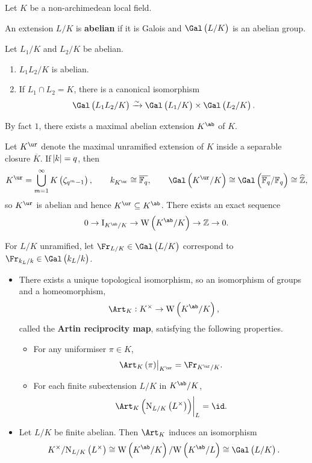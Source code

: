 
Let $ K $ be a non-archimedean local field.

\begin{definition}
An extension $ L / K $ is \textbf{abelian} if it is Galois and $ \Gal\br{L / K} $ is an abelian group.
\end{definition}

\begin{fact*}
Let $ L_1 / K $ and $ L_2 / K $ be abelian.
\begin{enumerate}
\item $ L_1L_2 / K $ is abelian.
\item If $ L_1 \cap L_2 = K $, there is a canonical isomorphism
$$ \Gal\br{L_1L_2 / K} \xrightarrow{\sim} \Gal\br{L_1 / K} \times \Gal\br{L_2 / K}. $$
\end{enumerate}
By fact $ 1 $, there exists a maximal abelian extension $ K^{\ab} $ of $ K $.
\end{fact*}

\begin{example*}
Let $ K^{\ur} $ denote the maximal unramified extension of $ K $ inside a separable closure $ \overline{K} $. If $ \abs{k} = q $, then
$$ K^{\ur} = \bigcup_{m = 1}^\infty K\br{\zeta_{q^m - 1}}, \qquad k_{K^{\ur}} \cong \overline{\FF_q}, \qquad \Gal\br{K^{\ur} / K} \cong \Gal\br{\overline{\FF_q} / \FF_q} \cong \widehat{\ZZ}, $$
so $ K^{\ur} $ is abelian and hence $ K^{\ur} \subseteq K^{\ab} $. There exists an exact sequence
$$ 0 \to \I_{K^{\ab} / K} \to \W\br{K^{\ab} / K} \to \ZZ \to 0. $$
\end{example*}

For $ L / K $ unramified, let $ \Fr_{L / K} \in \Gal\br{L / K} $ correspond to $ \Fr_{k_L / k} \in \Gal\br{k_L / k} $.

\begin{theorem}
\hfill
\begin{itemize}
\item There exists a unique topological isomorphism, so an isomorphism of groups and a homeomorphism,
$$ \Art_K : K^\times \to \W\br{K^{\ab} / K}, $$
called the \textbf{Artin reciprocity map}, satisfying the following properties.
\begin{itemize}
\item For any uniformiser $ \pi \in K $,
$$ \eval{\Art_K\br{\pi}}_{K^{\ur}} = \Fr_{K^{\ur} / K}. $$
\item For each finite subextension $ L / K $ in $ K^{\ab} / K $,
$$ \eval{\Art_K\br{\N_{L / K}\br{L^\times}}}_L = \id. $$
\end{itemize}
\item Let $ L / K $ be finite abelian. Then $ \Art_K $ induces an isomorphism
$$ K^\times / \N_{L / K}\br{L^\times} \cong \W\br{K^{\ab} / K} / \W\br{K^{\ab} / L} \cong \Gal\br{L / K}. $$
\end{itemize}
\end{theorem}

